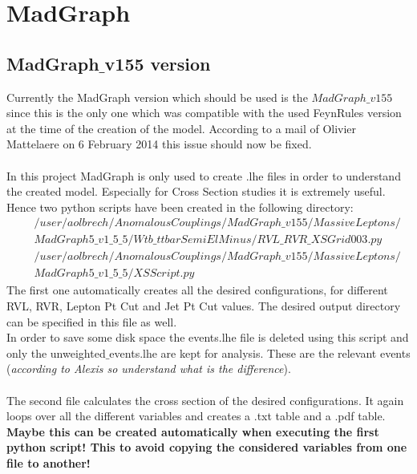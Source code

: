\documentclass[a4paper,12pt]{report}
\begin{document}
\section{MadGraph}

\subsection{MadGraph$\_$v155 version}
Currently the MadGraph version which should be used is the $MadGraph\_v155$ since this is the only one which was compatible with the used FeynRules version at the time of the creation of the model. According to a mail of Olivier Mattelaere on 6 February 2014 this issue should now be fixed.\\
\\
In this project MadGraph is only used to create .lhe files in order to understand the created model. Especially for Cross Section studies it is extremely useful.\\
Hence two python scripts have been created in the following directory:
\begin{eqnarray*}
  & & /user/aolbrech/AnomalousCouplings/MadGraph\_v155/MassiveLeptons/\\ & & MadGraph5\_v1\_5\_5/Wtb\_ttbarSemiElMinus/RVL\_RVR\_XSGrid003.py \\
  & & /user/aolbrech/AnomalousCouplings/MadGraph\_v155/MassiveLeptons/\\ & & MadGraph5\_v1\_5\_5/XSScript.py
\end{eqnarray*}
The first one automatically creates all the desired configurations, for different RVL, RVR, Lepton Pt Cut and Jet Pt Cut values. The desired output directory can be specified in this file as well.\\
In order to save some disk space the events.lhe file is deleted using this script and only the unweighted$\_$events.lhe are kept for analysis. These are the relevant events (\textit{according to Alexis so understand what is the difference}).\\
\\
The second file calculates the cross section of the desired configurations. It again loops over all the different variables and creates a .txt table and a .pdf table.\\
\textbf{Maybe this can be created automatically when executing the first python script! This to avoid copying the considered variables from one file to another!}
\end{document}
